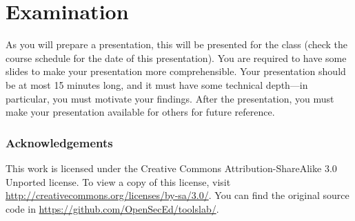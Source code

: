 \section{Examination}
\label{sec:exam}
As you will prepare a presentation, this will be presented for the class (check 
the course schedule for the date of this presentation).
You are required to have some slides to make your presentation more 
comprehensible.
Your presentation should be at most 15 minutes long, and it must have some 
technical depth---in particular, you must motivate your findings.
After the presentation, you must make your presentation available for others 
for future reference.


\subsubsection*{Acknowledgements}

This work is licensed under the Creative Commons Attribution-ShareAlike 3.0 
Unported license.
To view a copy of this license, visit 
\url{http://creativecommons.org/licenses/by-sa/3.0/}.
You can find the original source code in 
\url{https://github.com/OpenSecEd/toolslab/}.


\printbibliography{}
